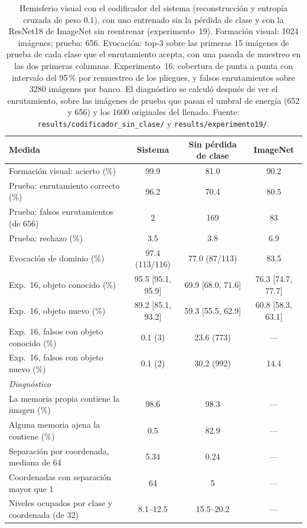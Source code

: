 \begin{table}[H]
    \centering
    \caption[Hemisferio visual con tres codificadores]{Hemisferio visual con el codificador del sistema (reconstrucción y entropía
    cruzada de peso 0.1), con uno entrenado sin la pérdida de clase y con la ResNet18 de
    ImageNet sin reentrenar (experimento~19). Formación visual: 1024 imágenes; prueba: 656.
    Evocación: top-3 sobre las primeras 15 imágenes de prueba de cada clase que el
    enrutamiento acepta, con una pasada de muestreo en las dos primeras columnas.
    Experimento~16: cobertura de punta a punta con intervalo del 95\,\% por remuestreo de
    los pliegues, y falsos enrutamientos sobre 3280 imágenes por banco. El diagnóstico se
    calculó después de ver el enrutamiento, sobre las imágenes de prueba que pasan el
    umbral de energía (652 y 656) y los 1600 originales del llenado. Fuente:
    \texttt{results/codificador\_sin\_clase/} y \texttt{results/experimento19/}.}
    \label{tab:codificador-sin-clase}
    \footnotesize
    \setlength{\tabcolsep}{4pt}
    \begin{tabular}{lccc}
        \toprule
        Medida & Sistema & Sin pérdida de clase & ImageNet \\
        \midrule
        Formación visual: acierto (\%)                 & 99.9 & 81.0 & 90.2 \\
        Prueba: enrutamiento correcto (\%)             & 96.2 & 70.4 & 80.5 \\
        Prueba: falsos enrutamientos (de 656)          & 2    & 169  & 83   \\
        Prueba: rechazo (\%)                           & 3.5  & 3.8  & 6.9  \\
        Evocación de dominio (\%)                      & 97.4 (113/116) & 77.0 (87/113) & 83.5 \\
        Exp.~16, objeto conocido (\%)        & 95.5 [95.1, 95.9] & 69.9 [68.0, 71.6] & 76.3 [74.7, 77.7] \\
        Exp.~16, objeto nuevo (\%)           & 89.2 [85.1, 93.2] & 59.3 [55.5, 62.9] & 60.8 [58.3, 63.1] \\
        Exp.~16, falsos con objeto conocido (\%) & 0.1 (3)   & 23.6 (773) & ---  \\
        Exp.~16, falsos con objeto nuevo (\%)    & 0.1 (2)   & 30.2 (992) & 14.4 \\
        \midrule
        \multicolumn{4}{l}{\emph{Diagnóstico}} \\
        La memoria propia contiene la imagen (\%)        & 98.6     & 98.3      & --- \\
        Alguna memoria ajena la contiene (\%)            & 0.5      & 82.9      & --- \\
        Separación por coordenada, mediana de 64         & 5.34     & 0.24      & --- \\
        Coordenadas con separación mayor que 1           & 64       & 5         & --- \\
        Niveles ocupados por clase y coordenada (de 32)  & 8.1--12.5 & 15.5--20.2 & --- \\
        \bottomrule
    \end{tabular}
\end{table}

